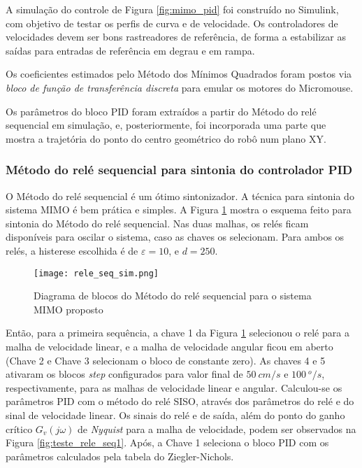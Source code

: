 A simulação do controle de Figura \ref{fig:mimo_pid} foi construído no Simulink, com objetivo de testar os perfis de curva e de velocidade. Os controladores de velocidades devem ser bons rastreadores de referência, de forma a estabilizar as saídas para entradas de referência em degrau e em rampa. 

Os coeficientes estimados pelo Método dos Mínimos Quadrados foram postos via \emph{bloco de função de transferência discreta} para emular os motores do Micromouse.

Os parâmetros do bloco PID foram extraídos a partir do Método do relé sequencial em simulação, e, posteriormente, foi incorporada uma parte que mostra a trajetória do ponto do centro geométrico do robô num plano XY.

\subsubsection{Método do relé sequencial para sintonia do controlador PID}

O Método do relé sequencial é um ótimo sintonizador. A técnica para sintonia do sistema MIMO é bem prática e simples. A Figura \ref{fig:controle_simulink_rele} mostra o esquema feito para sintonia do Método do relé sequencial. Nas duas malhas, os relés ficam disponíveis para oscilar o sistema, caso as chaves os selecionam. Para ambos os relés, a histerese escolhida é de $\varepsilon=10$, e $d = 250$.

\begin{figure}[!h]
	\caption{\label{fig:controle_simulink_rele}Diagrama de blocos do Método do relé sequencial para o sistema MIMO proposto}
	\begin{center}
		\texttt{[image: rele\_seq\_sim.png]}
	\end{center}
\end{figure}

Então, para a primeira sequência, a chave 1 da Figura \ref{fig:controle_simulink_rele} selecionou o relé para a malha de velocidade linear, e a malha de velocidade angular ficou em aberto (Chave 2 e Chave 3 selecionam o bloco de constante zero). As chaves 4 e 5 ativaram os blocos \emph{step} configurados para valor final de $50~cm/s$ e $100~^o/s$, respectivamente, para as malhas de velocidade linear e angular. Calculou-se os parâmetros PID com o método do relé SISO, através dos parâmetros do relé e do sinal de velocidade linear. Os sinais do relé e de saída, além do ponto do ganho crítico $G_v(j\omega)$ de \emph{Nyquist} para a malha de velocidade, podem ser observados na Figura \ref{fig:teste_rele_seq1}. Após, a Chave 1 seleciona o bloco PID com os parâmetros calculados pela tabela do Ziegler-Nichols.


